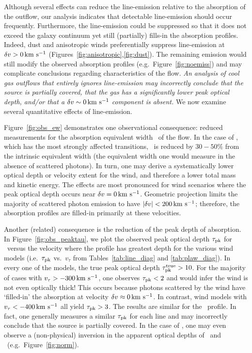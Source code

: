 \documentclass[12pt,preprint]{aastex}
\begin{document}
Although several effects can reduce the line-emission
relative to the absorption of the outflow, our analysis
indicates that detectable line-emission should occur frequently. 
Furthermore, the line-emission could be suppressed so %
that it does not
exceed
the galaxy continuum yet still (partially) fills-in the absorption
profiles. Indeed, dust and anisotropic winds preferentially suppress
line-emission at $\delta v > 0 \, {\rm km~s^{-1}}$
(Figures~\ref{fig:anisotropic},\ref{fig:dust}).
The remaining emission would still 
modify the observed absorption profiles (e.g.\
Figure~\ref{fig:noemiss}) and may complicate conclusions
regarding characteristics of the flow.  {\it An analysis of cool gas outflows
that entirely ignores line-emission may incorrectly conclude that the source is
partially covered, that the gas has a significantly lower peak optical depth,
and/or that a $\delta v \sim 0 \, {\rm km~s^{-1}}$ component is
absent.}  
We now examine several quantitative effects of line-emission.

Figure~\ref{fig:obs_ew} demonstrates one observational
consequence: reduced measurements for the absorption
equivalent width \ewabs\ of the flow.  In the case of ,
which has the most strongly affected transitions, \ewabs\ is reduced by
$30-50\%$ from the intrinsic equivalent width (the equivalent width
one would measure in the absence of scattered photons).  In turn, one may derive 
a systematically lower optical depth or velocity extent for the wind,
and therefore a lower total mass and kinetic energy.  
The effects are most pronounced for wind
scenarios where the peak optical depth occurs near $\delta v = 0 \, {\rm km~s^{-1}}$.
Geometric projection limits the majority of scattered photon emission to
have $|\delta v| < 200 \, {\rm km~s^{-1}}$; therefore,  the absorption profiles
are filled-in primarily at these velocities.  

Another (related) consequence is the reduction of the peak depth of 
absorption.
In Figure~\ref{fig:obs_peaktau}, we plot the observed peak optical depth
$\tau_{\rm pk}$ for \mgiia\ 
versus the velocity where the profile has greatest depth 
for the various wind models (i.e.\
$\tau_{\rm pk}$ vs.\ $v_\tau$ from Tables~\ref{tab:line_diag} and
\ref{tab:plaw_diag}).   In every one of the models, the true peak
optical depth $\tau_{\rm pk}^{\rm true} > 10$.  For the
majority of cases with $v_\tau > -300\, {\rm km~s^{-1}}$, one observes $\tau_{\rm pk} <
2$ and would infer the wind is not even optically thick!
This occurs because photons scattered by the wind have `filled-in' the
absorption at velocity $\delta v \approx 0 \, {\rm km~s^{-1}}$.  In contrast, wind
models with $v_\tau < -400 \, {\rm km~s^{-1}}$ all yield $\tau_{\rm pk} > 3$.  The
results are similar for the \mgiib\ profile.  In fact, one generally
measures a similar $\tau_{\rm pk}$ for each \ion{Mg}{2} line and %
may incorrectly conclude that the source is partially covered. 
In the case of \ion{Fe}{2}, one may even observe a (non-physical)
inversion in the apparent optical depths of \feiia\ and \feiib\ (e.g.\
Figure~\ref{fig:norm}). 
\end{document}
